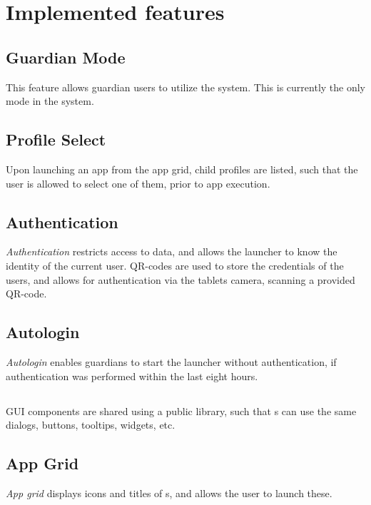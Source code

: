 \section{Implemented features}
\label{backlog_implemented}

\subsection{Guardian Mode}
\label{backlog:guardian_mode}
This feature allows guardian users to utilize the \giraf[] system. 
This is currently the only mode in the system.

%
\subsection{Profile Select}
\label{backlog:profile_select}
Upon launching an app from the app grid, child profiles are listed, such that the user is allowed to select one of them, prior to app execution.

%
\subsection{Authentication}
\label{backlog:authentication}
\emph{Authentication} restricts access to data, and allows the launcher to know the identity of the current user.
QR-codes are used to store the credentials of the users, and allows for authentication via the tablets camera, scanning a provided QR-code.

\subsection{Autologin}
\label{backlog:autologin}
\emph{Autologin} enables guardians to start the launcher without authentication, if authentication was performed within the last eight hours.

%
\subsection{\guicomponents[]}
\label{backlog:GUI_components}
GUI components are shared using a public library, such that \girafapp[]s can use the same dialogs, buttons, tooltips, widgets, etc.

\subsection{App Grid}
\label{backlog:appgrid}
\emph{App grid} displays icons and titles of \girafapp[]s, and allows the user to launch these.

